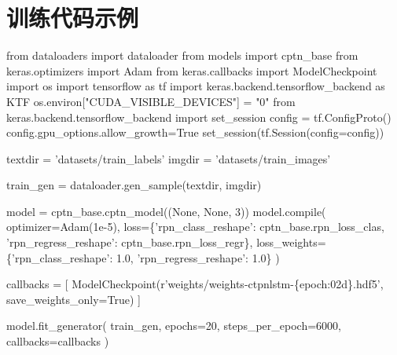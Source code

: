\documentclass[11pt]{article}
\newenvironment{Shaded}{}{}
\newcommand{\DecValTok}[1]{\textcolor[rgb]{0.25,0.63,0.44}{{#1}}}
\newcommand{\FloatTok}[1]{\textcolor[rgb]{0.25,0.63,0.44}{{#1}}}
\newcommand{\StringTok}[1]{\textcolor[rgb]{0.25,0.44,0.63}{{#1}}}
\newcommand{\NormalTok}[1]{{#1}}
\newcommand{\SpecialCharTok}[1]{\textcolor[rgb]{0.25,0.44,0.63}{{#1}}}
\newcommand{\VerbatimStringTok}[1]{\textcolor[rgb]{0.25,0.44,0.63}{{#1}}}
\newcommand{\ImportTok}[1]{{#1}}
\newcommand{\VariableTok}[1]{\textcolor[rgb]{0.10,0.09,0.49}{{#1}}}
\newcommand{\OperatorTok}[1]{\textcolor[rgb]{0.40,0.40,0.40}{{#1}}}
\newcommand{\BuiltInTok}[1]{{#1}}
\begin{document}
    \hypertarget{ux8badux7ec3ux4ee3ux7801ux793aux4f8b}{%
\section{训练代码示例}\label{ux8badux7ec3ux4ee3ux7801ux793aux4f8b}}

    \begin{Shaded}
\begin{Highlighting}[]

\ImportTok{from}\NormalTok{ dataloaders }\ImportTok{import}\NormalTok{ dataloader}
\ImportTok{from}\NormalTok{ models }\ImportTok{import}\NormalTok{ cptn_base}
\ImportTok{from}\NormalTok{ keras.optimizers }\ImportTok{import}\NormalTok{ Adam }
\ImportTok{from}\NormalTok{ keras.callbacks }\ImportTok{import}\NormalTok{ ModelCheckpoint}
\ImportTok{import}\NormalTok{ os}
\ImportTok{import}\NormalTok{ tensorflow }\ImportTok{as}\NormalTok{ tf}
\ImportTok{import}\NormalTok{ keras.backend.tensorflow_backend }\ImportTok{as}\NormalTok{ KTF}
\NormalTok{os.environ[}\StringTok{"CUDA_VISIBLE_DEVICES"}\NormalTok{] }\OperatorTok{=} \StringTok{"0"}
\ImportTok{from}\NormalTok{ keras.backend.tensorflow_backend }\ImportTok{import}\NormalTok{ set_session }
\NormalTok{config }\OperatorTok{=}\NormalTok{ tf.ConfigProto() }
\NormalTok{config.gpu_options.allow_growth}\OperatorTok{=}\VariableTok{True}
\NormalTok{set_session(tf.Session(config}\OperatorTok{=}\NormalTok{config))}


\NormalTok{textdir }\OperatorTok{=} \StringTok{'datasets/train_labels'}
\NormalTok{imgdir  }\OperatorTok{=} \StringTok{'datasets/train_images'}

\NormalTok{train_gen }\OperatorTok{=}\NormalTok{ dataloader.gen_sample(textdir, imgdir)}

\NormalTok{model }\OperatorTok{=}\NormalTok{ cptn_base.cptn_model((}\VariableTok{None}\NormalTok{, }\VariableTok{None}\NormalTok{, }\DecValTok{3}\NormalTok{))}
\NormalTok{model.}\BuiltInTok{compile}\NormalTok{(}
\NormalTok{    optimizer}\OperatorTok{=}\NormalTok{Adam(}\FloatTok{1e-5}\NormalTok{),}
\NormalTok{    loss}\OperatorTok{=}\NormalTok{\{}\StringTok{'rpn_class_reshape'}\NormalTok{: cptn_base.rpn_loss_clas, }\StringTok{'rpn_regress_reshape'}\NormalTok{: cptn_base.rpn_loss_regr\},}
\NormalTok{    loss_weights}\OperatorTok{=}\NormalTok{\{}\StringTok{'rpn_class_reshape'}\NormalTok{: }\FloatTok{1.0}\NormalTok{, }\StringTok{'rpn_regress_reshape'}\NormalTok{: }\FloatTok{1.0}\NormalTok{\}}
\NormalTok{)}

\NormalTok{callbacks }\OperatorTok{=}\NormalTok{ [}
\NormalTok{    ModelCheckpoint(}\VerbatimStringTok{r'weights/weights-ctpnlstm-}\SpecialCharTok{\{epoch:02d\}}\VerbatimStringTok{.hdf5'}\NormalTok{,}
\NormalTok{                    save_weights_only}\OperatorTok{=}\VariableTok{True}\NormalTok{)}
\NormalTok{]}

\NormalTok{model.fit_generator(}
\NormalTok{    train_gen,}
\NormalTok{    epochs}\OperatorTok{=}\DecValTok{20}\NormalTok{,}
\NormalTok{    steps_per_epoch}\OperatorTok{=}\DecValTok{6000}\NormalTok{,}
\NormalTok{    callbacks}\OperatorTok{=}\NormalTok{callbacks}
\NormalTok{)}
\end{Highlighting}
\end{Shaded}
\end{document}

